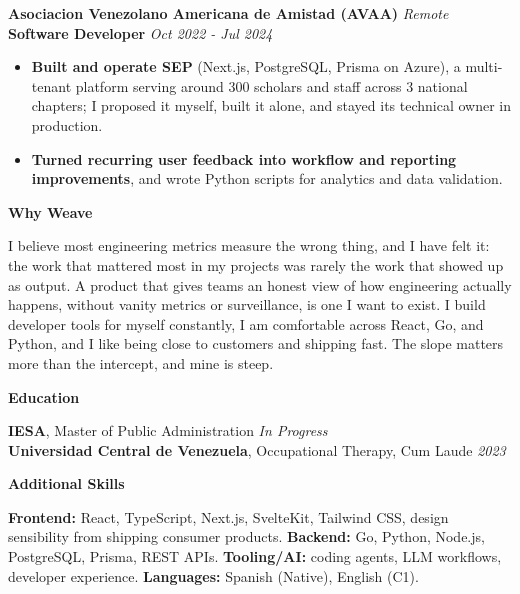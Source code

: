 \documentclass[10pt]{article}
\newcommand{\sectiontitle}[1]{%
    \vspace{5pt}
    \begin{center}
        \textbf{#1}
    \end{center}
    \vspace{-6pt}
}
\begin{document}
\vspace{4pt}
\textbf{Asociacion Venezolano Americana de Amistad (AVAA)} \hfill \textit{Remote} \\
\textbf{Software Developer} \hfill \textit{Oct 2022 - Jul 2024}
\begin{itemize}
    \item \textbf{Built and operate SEP} (Next.js, PostgreSQL, Prisma on Azure), a multi-tenant platform serving around 300 scholars and staff across 3 national chapters; I proposed it myself, built it alone, and stayed its technical owner in production.
    \item \textbf{Turned recurring user feedback into workflow and reporting improvements}, and wrote Python scripts for analytics and data validation.
\end{itemize}

\sectiontitle{Why Weave}
I believe most engineering metrics measure the wrong thing, and I have felt it: the work that mattered most in my projects was rarely the work that showed up as output. A product that gives teams an honest view of how engineering actually happens, without vanity metrics or surveillance, is one I want to exist. I build developer tools for myself constantly, I am comfortable across React, Go, and Python, and I like being close to customers and shipping fast. The slope matters more than the intercept, and mine is steep.

\sectiontitle{Education}
\textbf{IESA}, Master of Public Administration \hfill \textit{In Progress} \\
\textbf{Universidad Central de Venezuela}, Occupational Therapy, Cum Laude \hfill \textit{2023}

\sectiontitle{Additional Skills}
\textbf{Frontend:} React, TypeScript, Next.js, SvelteKit, Tailwind CSS, design sensibility from shipping consumer products. \textbf{Backend:} Go, Python, Node.js, PostgreSQL, Prisma, REST APIs. \textbf{Tooling/AI:} coding agents, LLM workflows, developer experience. \textbf{Languages:} Spanish (Native), English (C1).
\end{document}
